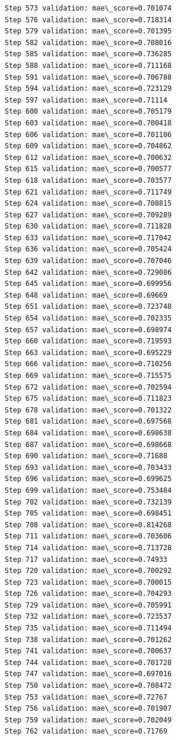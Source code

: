 \documentclass[11pt]{article}
\begin{document}
\begin{Verbatim}[commandchars=\\\{\}]
Step 573 validation: mae\_score=0.701074
Step 576 validation: mae\_score=0.718314
Step 579 validation: mae\_score=0.701395
Step 582 validation: mae\_score=0.708016
Step 585 validation: mae\_score=0.736285
Step 588 validation: mae\_score=0.711168
Step 591 validation: mae\_score=0.706788
Step 594 validation: mae\_score=0.723129
Step 597 validation: mae\_score=0.71114
Step 600 validation: mae\_score=0.705179
Step 603 validation: mae\_score=0.700418
Step 606 validation: mae\_score=0.701106
Step 609 validation: mae\_score=0.704862
Step 612 validation: mae\_score=0.700632
Step 615 validation: mae\_score=0.700577
Step 618 validation: mae\_score=0.703577
Step 621 validation: mae\_score=0.711749
Step 624 validation: mae\_score=0.708815
Step 627 validation: mae\_score=0.709289
Step 630 validation: mae\_score=0.711828
Step 633 validation: mae\_score=0.717042
Step 636 validation: mae\_score=0.705424
Step 639 validation: mae\_score=0.707046
Step 642 validation: mae\_score=0.729086
Step 645 validation: mae\_score=0.699956
Step 648 validation: mae\_score=0.69669
Step 651 validation: mae\_score=0.723748
Step 654 validation: mae\_score=0.702335
Step 657 validation: mae\_score=0.698974
Step 660 validation: mae\_score=0.719593
Step 663 validation: mae\_score=0.695229
Step 666 validation: mae\_score=0.710256
Step 669 validation: mae\_score=0.715575
Step 672 validation: mae\_score=0.702594
Step 675 validation: mae\_score=0.711823
Step 678 validation: mae\_score=0.701322
Step 681 validation: mae\_score=0.697568
Step 684 validation: mae\_score=0.698638
Step 687 validation: mae\_score=0.698668
Step 690 validation: mae\_score=0.71688
Step 693 validation: mae\_score=0.703433
Step 696 validation: mae\_score=0.699625
Step 699 validation: mae\_score=0.753484
Step 702 validation: mae\_score=0.732139
Step 705 validation: mae\_score=0.698451
Step 708 validation: mae\_score=0.814268
Step 711 validation: mae\_score=0.703606
Step 714 validation: mae\_score=0.713728
Step 717 validation: mae\_score=0.74933
Step 720 validation: mae\_score=0.700292
Step 723 validation: mae\_score=0.700015
Step 726 validation: mae\_score=0.704293
Step 729 validation: mae\_score=0.705991
Step 732 validation: mae\_score=0.723537
Step 735 validation: mae\_score=0.711494
Step 738 validation: mae\_score=0.701262
Step 741 validation: mae\_score=0.700637
Step 744 validation: mae\_score=0.701728
Step 747 validation: mae\_score=0.697016
Step 750 validation: mae\_score=0.708472
Step 753 validation: mae\_score=0.72767
Step 756 validation: mae\_score=0.701907
Step 759 validation: mae\_score=0.702049
Step 762 validation: mae\_score=0.71769

\end{Verbatim}
\end{document}
